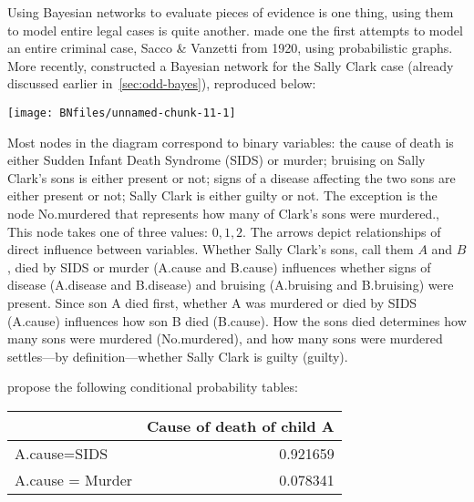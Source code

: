 \documentclass{article}
\begin{document}
Using Bayesian networks to evaluate pieces of evidence is one thing, using them to
model entire legal cases is quite another. \cite{kadane2011probabilistic}
made one the first attempts to model an entire criminal case, Sacco \& Vanzetti from 1920, using probabilistic graphs. More recently, \cite{Fenton2018Risk} constructed a Bayesian network for the Sally Clark case (already discussed earlier in~\ref{sec:odd-bayes}), reproduced below:


%
\begin{center}\texttt{[image: BNfiles/unnamed-chunk-11-1]} \end{center}

\noindent
Most nodes in the diagram correspond to binary 
variables: the cause of death is either Sudden Infant Death Syndrome (SIDS)
or murder; bruising on Sally Clark's sons is either present or not; signs of a disease affecting the two sons are either present or not; 
Sally Clark is either guilty or not. 
The exception 
is the node \textsf{No.murdered} that represents how many of Clark's sons were murdered., This node takes one of three values: \(0, 1, 2\).
%
The arrows depict relationships of direct influence between variables. Whether Sally Clark's sons, call them \(A\) and \(B\), died by SIDS or murder (\textsf{A.cause} and \textsf{B.cause}) influences whether signs of disease (\textsf{A.disease} and \textsf{B.disease}) and bruising (\textsf{A.bruising} and \textsf{B.bruising})  were present. %
Since son A died first, whether A was murdered or died by SIDS (\textsf{A.cause}) influences how son B died (\textsf{B.cause}). 
How the sons died %
determines how many sons were murdered (\textsf{No.murdered}), and how many sons were murdered settles---by definition---whether Sally Clark is guilty (\textsf{guilty}). 

\cite{Fenton2018Risk} propose the following conditional probability tables:

\begin{table}[H]
\centering
\begin{tabular}{lr}
\toprule
  & Cause of death of child A\\
\midrule
A.cause=SIDS & 0.921659\\
A.cause = Murder & 0.078341\\
\bottomrule
\end{tabular}
\end{table}
\end{document}
